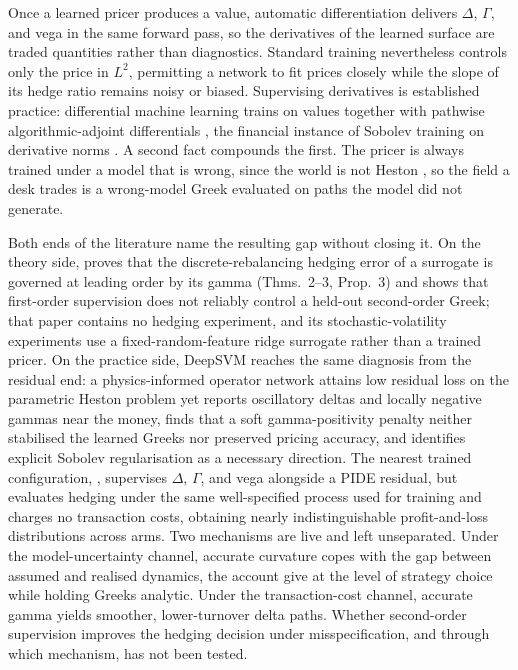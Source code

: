 \documentclass[10pt]{article}
\begin{document}
Once a learned pricer produces a value, automatic differentiation delivers $\Delta$,
$\Gamma$, and vega in the same forward pass, so the derivatives of the learned
surface are traded quantities rather than diagnostics. Standard training
nevertheless controls only the price in $L^{2}$, permitting a network to fit prices
closely while the slope of its hedge ratio remains noisy or biased. Supervising
derivatives is established practice: differential machine learning trains on values
together with pathwise algorithmic-adjoint differentials
\citep{huge2020differential}, the financial instance of Sobolev training on
derivative norms \citep{czarnecki2017sobolev}. A second fact compounds the first.
The pricer is always trained under a model that is wrong, since the world is not
Heston \citep{heston1993closed}, so the field a desk trades is a wrong-model Greek
evaluated on paths the model did not generate.

Both ends of the literature name the resulting gap without closing it. On the
theory side, \citet{noguer2026derivative} proves that the discrete-rebalancing
hedging error of a surrogate is governed at leading order by its gamma
(Thms.~2--3, Prop.~3) and shows that first-order supervision does not reliably
control a held-out second-order Greek; that paper contains no hedging experiment,
and its stochastic-volatility experiments use a fixed-random-feature ridge
surrogate rather than a trained pricer. On the practice side, DeepSVM
\citep{chakhoyan2025deepsvm} reaches the same diagnosis from the residual end: a
physics-informed operator network attains low residual loss on the parametric
Heston problem yet reports oscillatory deltas and locally negative gammas near the
money, finds that a soft gamma-positivity penalty neither stabilised the learned
Greeks nor preserved pricing accuracy, and identifies explicit Sobolev
regularisation as a necessary direction. The nearest trained configuration,
\citet{sakuma2026a}, supervises $\Delta$, $\Gamma$, and vega alongside a PIDE
residual, but evaluates hedging under the same well-specified process used for
training and charges no transaction costs, obtaining nearly indistinguishable
profit-and-loss distributions across arms. Two mechanisms are live and left
unseparated. Under the model-uncertainty channel, accurate curvature copes with the
gap between assumed and realised dynamics, the account \citet{armstrong2024deep}
give at the level of strategy choice while holding Greeks analytic. Under the
transaction-cost channel, accurate gamma yields smoother, lower-turnover delta
paths. Whether second-order supervision improves the hedging decision under
misspecification, and through which mechanism, has not been tested.
\end{document}
